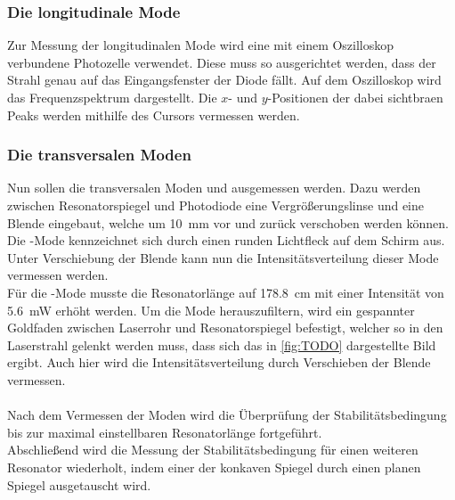 \subsubsection{Die longitudinale Mode}

    Zur Messung der longitudinalen Mode wird eine mit einem Oszilloskop verbundene Photozelle verwendet.
    Diese muss so ausgerichtet werden,
    dass der Strahl genau auf das Eingangsfenster der Diode fällt.
    Auf dem Oszilloskop wird das Frequenzspektrum dargestellt.
    Die $x$- und $y$-Positionen der dabei sichtbraen Peaks
    werden mithilfe des Cursors vermessen werden.


\subsubsection{Die transversalen Moden}

    Nun sollen die transversalen Moden  und  ausgemessen werden.
    Dazu werden zwischen Resonatorspiegel und Photodiode eine Vergrößerungslinse und eine Blende eingebaut,
    welche um \SI{10}{\milli\meter} vor und zurück verschoben werden können.\\ %
    Die -Mode kennzeichnet sich durch einen runden Lichtfleck auf dem Schirm aus.
    Unter Verschiebung der Blende kann nun die Intensitätsverteilung dieser Mode vermessen werden.\\
    Für die -Mode musste die Resonatorlänge auf \SI{178.8}{\centi\meter} mit einer Intensität von \SI{5.6}{\milli\watt} erhöht werden.
    Um die Mode herauszufiltern,
    wird ein gespannter Goldfaden zwischen Laserrohr und Resonatorspiegel befestigt,
    welcher so in den Laserstrahl gelenkt werden muss,
    dass sich das in \autoref{fig:TODO} dargestellte Bild ergibt.
    Auch hier wird die Intensitätsverteilung durch Verschieben der Blende vermessen.\\
    \\
    Nach dem Vermessen der Moden wird die Überprüfung der Stabilitätsbedingung bis zur maximal einstellbaren Resonatorlänge fortgeführt.\\
    Abschließend wird die Messung der Stabilitätsbedingung für einen weiteren Resonator wiederholt,
    indem einer der konkaven Spiegel durch einen planen Spiegel ausgetauscht wird.
